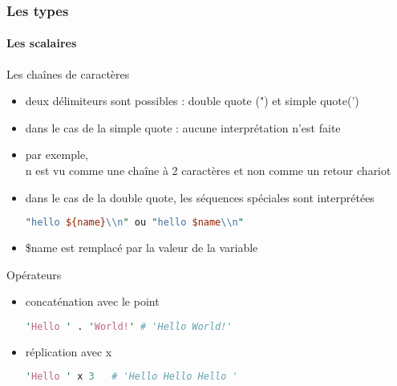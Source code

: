 \begin{frame}[fragile]
  \frametitle{Les types}
  \framesubtitle{Les scalaires}

  \begin{block}{Les chaînes de caractères}
    \begin{itemize}
    \item deux délimiteurs sont possibles : double quote (") et simple quote(')
    \item dans le cas de la simple quote : aucune interprétation n'est faite
    \item par exemple, \\n est vu comme une chaîne à 2 caractères et non
      comme un retour chariot
    \item dans le cas de la double quote, les séquences spéciales sont
      interprétées
      \begin{lstlisting}[language=perl]
"hello ${name}\\n" ou "hello $name\\n"
      \end{lstlisting}
    \item \$name est remplacé par la valeur de la variable
    \end{itemize}
  \end{block}

  \begin{exampleblock}{Opérateurs}
    \begin{itemize}
    \item concaténation avec le point
      \begin{lstlisting}[language=perl]
'Hello ' . 'World!' # 'Hello World!'
      \end{lstlisting}
    \item réplication avec x
      \begin{lstlisting}[language=perl]
'Hello ' x 3   # 'Hello Hello Hello '
      \end{lstlisting}
    \end{itemize}
  \end{exampleblock}

\end{frame}

